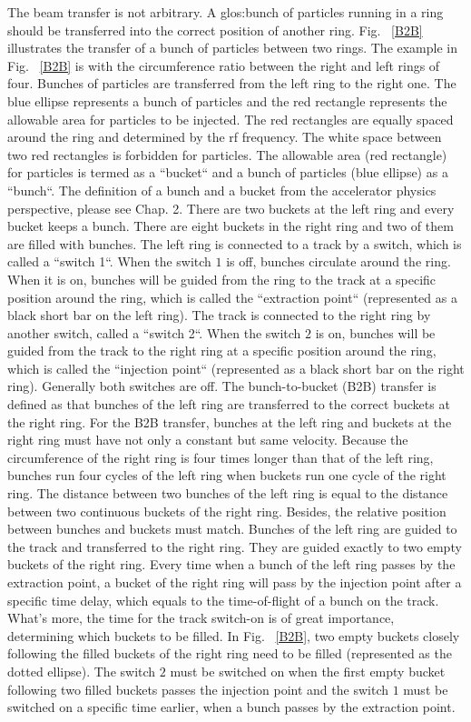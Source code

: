 The beam transfer is not arbitrary. A \gls{glos:bunch} of particles running in a ring should be transferred into the correct position of another ring. Fig. ~\ref{B2B} illustrates the transfer of a bunch of particles between two rings. The example in Fig. ~\ref{B2B} is with the circumference ratio between the right and left rings of four. Bunches of particles are transferred from the left ring to the right one. The blue ellipse represents a bunch of particles and the red rectangle represents the allowable area for particles to be injected. The red rectangles are equally spaced around the ring and determined by the rf frequency. The white space between two red rectangles is forbidden for particles. The allowable area (red rectangle) for particles is termed as a ``bucket`` and a bunch of particles (blue ellipse) as a ``bunch``. The definition of a bunch and a bucket from the accelerator physics perspective, please see Chap. 2. There are two buckets at the left ring and every bucket keeps a bunch. There are eight buckets in the right ring and two of them are filled with bunches. The left ring is connected to a track by a switch, which is called a ``switch 1``. When the switch $1$ is off, bunches circulate around the ring. When it is on, bunches will be guided from the ring to the track at a specific position around the ring, which is called the ``extraction point`` (represented as a black short bar on the left ring). The track is connected to the right ring by another switch, called a ``switch 2``. When the switch $2$ is on, bunches will be guided from the track to the right ring at a specific position around the ring, which is called the ``injection point`` (represented as a black short bar on the right ring). Generally both switches are off. The bunch-to-bucket (B2B) transfer is defined as that bunches of the left ring are transferred to the correct buckets at the right ring. For the B2B transfer, bunches at the left ring and buckets at the right ring must have not only a constant but same velocity. Because the circumference of the right ring is four times longer than that of the left ring, bunches run four cycles of the left ring when buckets run one cycle of the right ring. The distance between two bunches of the left ring is equal to the distance between two continuous buckets of the right ring. Besides, the relative position between bunches and buckets must match. Bunches of the left ring are guided to the track and transferred to the right ring. They are guided exactly to two empty buckets of the right ring. Every time when a bunch of the left ring passes by the extraction point, a bucket of the right ring will pass by the injection point after a specific time delay, which equals to the time-of-flight of a bunch on the track. What's more, the time for the track switch-on is of great importance, determining which buckets to be filled. In Fig. ~\ref{B2B}, two empty buckets closely following the filled buckets of the right ring need to be filled (represented as the dotted ellipse). The switch $2$ must be switched on when the first empty bucket following two filled buckets passes the injection point and the switch $1$ must be switched on a specific time earlier, when a bunch passes by the extraction point. 

